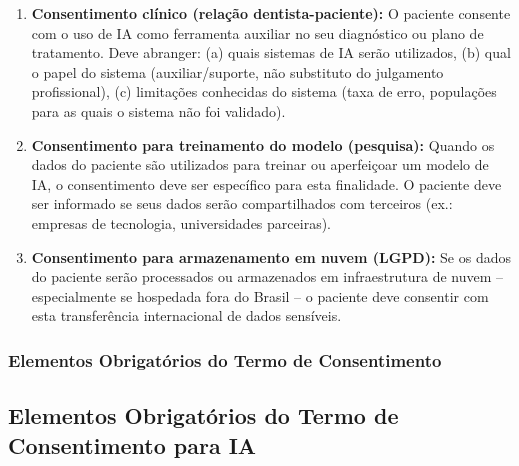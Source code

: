 \begin{enumerate}
  \item \textbf{Consentimento clínico (relação dentista-paciente):} O paciente
    consente com o uso de IA como ferramenta auxiliar no seu diagnóstico ou
    plano de tratamento. Deve abranger: (a) quais sistemas de IA serão
    utilizados, (b) qual o papel do sistema (auxiliar/suporte, não substituto
    do julgamento profissional), (c) limitações conhecidas do sistema
    (taxa de erro, populações para as quais o sistema não foi validado).

  \item \textbf{Consentimento para treinamento do modelo (pesquisa):} Quando os
    dados do paciente são utilizados para treinar ou aperfeiçoar um modelo de
    IA, o consentimento deve ser específico para esta finalidade. O paciente
    deve ser informado se seus dados serão compartilhados com terceiros
    (ex.: empresas de tecnologia, universidades parceiras).

  \item \textbf{Consentimento para armazenamento em nuvem (LGPD):} Se os dados
    do paciente serão processados ou armazenados em infraestrutura de nuvem --
    especialmente se hospedada fora do Brasil -- o paciente deve consentir com
    esta transferência internacional de dados sensíveis.
\end{enumerate}

\subsubsection{Elementos Obrigatórios do Termo de Consentimento}

\subsection{Elementos Obrigatórios do Termo de Consentimento para IA}


